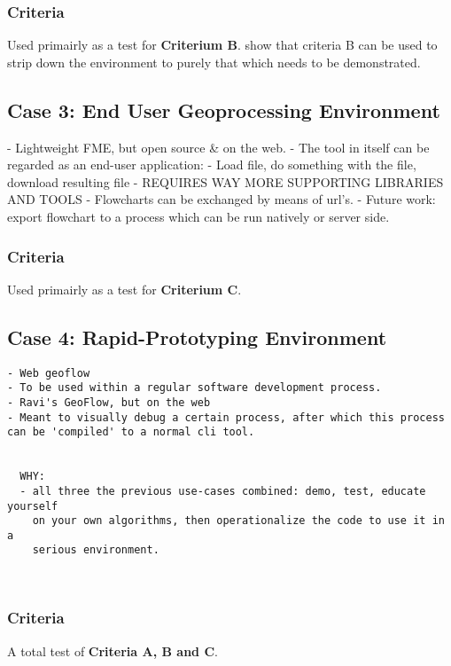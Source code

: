 \subsubsection*{Criteria}
Used primairly as a test for \textbf{Criterium B}.
show that criteria B can be used to strip down the environment to purely that which needs to be demonstrated.

\subsection*{Case 3: End User Geoprocessing Environment}
- Lightweight FME, but open source \& on the web.
- The tool in itself can be regarded as an end-user application:
  - Load file, do something with the file, download resulting file
  - REQUIRES WAY MORE SUPPORTING LIBRARIES AND TOOLS
- Flowcharts can be exchanged by means of url's.
- Future work: export flowchart to a process which can be run natively or server side.
  

\subsubsection*{Criteria}
Used primairly as a test for \textbf{Criterium C}.


\subsection*{Case 4: Rapid-Prototyping Environment}
\begin{lstlisting}
- Web geoflow
- To be used within a regular software development process.
- Ravi's GeoFlow, but on the web
- Meant to visually debug a certain process, after which this process can be 'compiled' to a normal cli tool.


  WHY: 
  - all three the previous use-cases combined: demo, test, educate yourself
    on your own algorithms, then operationalize the code to use it in a 
    serious environment.  

  
\end{lstlisting}







\subsubsection*{Criteria}
A total test of \textbf{Criteria A, B and C}.


